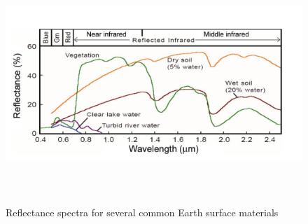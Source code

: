 \documentclass[document.tex]{subfiles}
\begin{document}
\begin{figure}[H]
	\begin{center}
		\includegraphics[height=9.0cm]{imgs/Materials.png}
	\end{center}
	\caption{Reflectance spectra for several common Earth surface materials\cite{35}}
	\label{fig:Reflectance spectra for several common Earth surface materials}
\end{figure}
\end{document}
